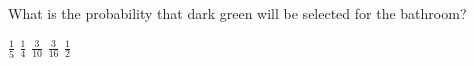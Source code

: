 \documentclass[answers,12pt]{exam}
\begin{document}
\begin{questions}
\question\label{LastColor}
What is the probability that dark green will be selected
for the bathroom?\\
\begin{oneparchoices}
\correctchoice $\frac{1}{5}$
\choice $\frac{1}{4}$ %
\choice $\frac{3}{10}$ %
\choice $\frac{3}{16}$ %
\choice $\frac{1}{2}$ %
\end{oneparchoices}


\end{questions}
\end{document}
